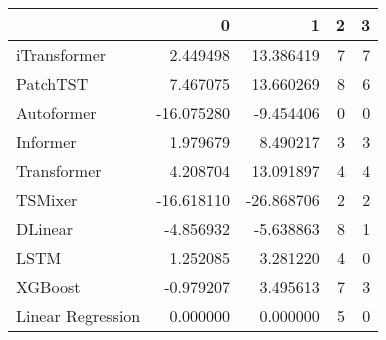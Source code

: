 \begin{tabular}{lrrrr}
\toprule
 & 0 & 1 & 2 & 3 \\
\midrule
iTransformer & 2.449498 & 13.386419 & 7 & 7 \\
PatchTST & 7.467075 & 13.660269 & 8 & 6 \\
Autoformer & -16.075280 & -9.454406 & 0 & 0 \\
Informer & 1.979679 & 8.490217 & 3 & 3 \\
Transformer & 4.208704 & 13.091897 & 4 & 4 \\
TSMixer & -16.618110 & -26.868706 & 2 & 2 \\
DLinear & -4.856932 & -5.638863 & 8 & 1 \\
LSTM & 1.252085 & 3.281220 & 4 & 0 \\
XGBoost & -0.979207 & 3.495613 & 7 & 3 \\
Linear Regression & 0.000000 & 0.000000 & 5 & 0 \\
\bottomrule
\end{tabular}
